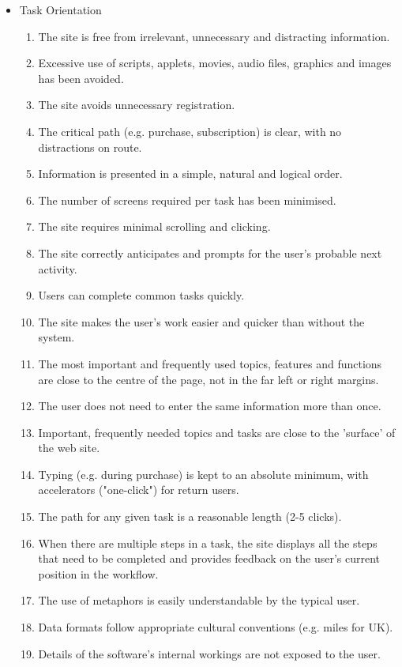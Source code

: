 \begin{itemize}
  \item Task Orientation
      \begin{enumerate}
        \item The site is free from irrelevant, unnecessary and distracting information.
        \item Excessive use of scripts, applets, movies, audio files, graphics and images has been avoided.
        \item The site avoids unnecessary registration.
        \item The critical path (e.g. purchase, subscription) is clear, with no distractions on route.
        \item Information is presented in a simple, natural and logical order.
        \item The number of screens required per task has been minimised.
        \item The site requires minimal scrolling and clicking.
        \item The site correctly anticipates and prompts for the user’s probable next activity.
        \item Users can complete common tasks quickly.
        \item The site makes the user’s work easier and quicker than without the system.
        \item The most important and frequently used topics, features and functions are close to the centre of the page, not in the far left or right margins.
        \item The user does not need to enter the same information more than once.
        \item Important, frequently needed topics and tasks are close to the 'surface' of the web site.
        \item Typing (e.g. during purchase) is kept to an absolute minimum, with accelerators ("one-click") for return users.
        \item The path for any given task is a reasonable length (2-5 clicks).
        \item When there are multiple steps in a task, the site displays all the steps that need to be completed and provides feedback on the user’s current position in the workflow.
        \item The use of metaphors is easily understandable by the typical user.
        \item Data formats follow appropriate cultural conventions (e.g. miles for UK).
        \item Details of the software's internal workings are not exposed to the user.

\end{enumerate}
\end{itemize}
